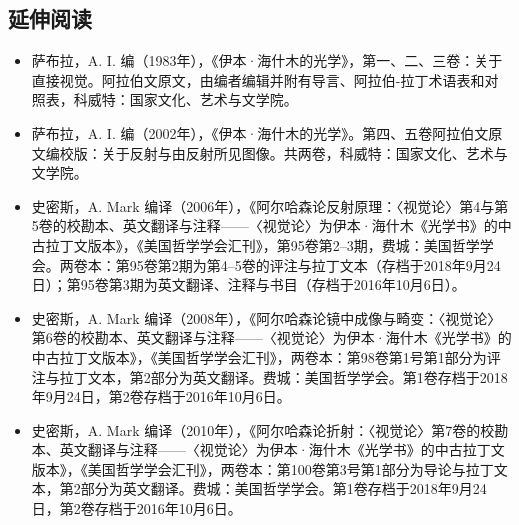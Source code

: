\subsection{延伸阅读}
\begin{itemize}
\item 萨布拉，A. I. 编（1983年），《伊本·海什木的光学》，第一、二、三卷：关于直接视觉。阿拉伯文原文，由编者编辑并附有导言、阿拉伯-拉丁术语表和对照表，科威特：国家文化、艺术与文学院。
\item 萨布拉，A. I. 编（2002年），《伊本·海什木的光学》。第四、五卷阿拉伯文原文编校版：关于反射与由反射所见图像。共两卷，科威特：国家文化、艺术与文学院。
\item 史密斯，A. Mark 编译（2006年），《阿尔哈森论反射原理：〈视觉论〉第4与第5卷的校勘本、英文翻译与注释——〈视觉论〉为伊本·海什木《光学书》的中古拉丁文版本》，《美国哲学学会汇刊》，第95卷第2–3期，费城：美国哲学学会。两卷本：第95卷第2期为第4–5卷的评注与拉丁文本（存档于2018年9月24日）；第95卷第3期为英文翻译、注释与书目（存档于2016年10月6日）。
\item 史密斯，A. Mark 编译（2008年），《阿尔哈森论镜中成像与畸变：〈视觉论〉第6卷的校勘本、英文翻译与注释——〈视觉论〉为伊本·海什木《光学书》的中古拉丁文版本》，《美国哲学学会汇刊》，两卷本：第98卷第1号第1部分为评注与拉丁文本，第2部分为英文翻译。费城：美国哲学学会。第1卷存档于2018年9月24日，第2卷存档于2016年10月6日。
\item 史密斯，A. Mark 编译（2010年），《阿尔哈森论折射：〈视觉论〉第7卷的校勘本、英文翻译与注释——〈视觉论〉为伊本·海什木《光学书》的中古拉丁文版本》，《美国哲学学会汇刊》，两卷本：第100卷第3号第1部分为导论与拉丁文本，第2部分为英文翻译。费城：美国哲学学会。第1卷存档于2018年9月24日，第2卷存档于2016年10月6日。
\end{itemize}
